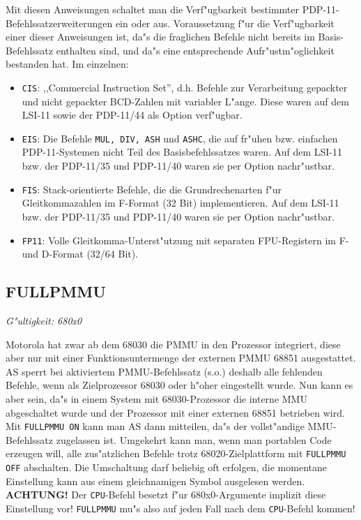 \documentclass[12pt,a4paper,twoside]{report}
\makeatletter
\newcommand{\bb}[1]{{\bf #1}}
\newcommand{\tty}[1]{{\tt #1}}
\newcommand{\ttindex}[1]{\index{#1@{\tt #1}}}
\makeatother
\begin{document}
Mit diesen Anweisungen schaltet man die Verf"ugbarkeit bestimmter
PDP-11-Befehlssatzerweiterungen ein oder aus.  Voraussetzung f"ur die
Verf"ugbarkeit einer dieser Anweisungen ist, da"s die fraglichen Befehle
nicht bereits im Basis-Befehlssatz enthalten sind, und da"s eine
entsprechende Aufr"ustm"oglichkeit bestanden hat.  Im einzelnen:
\begin{itemize}
\item{{\tt CIS}: ,,Commercial Instruction Set'', d.h. Befehle zur
      Verarbeitung gepackter und nicht gepackter BCD-Zahlen mit
      variabler L"ange.  Diese waren auf dem LSI-11 sowie der
      PDP-11/44 als Option verf"ugbar.}
\item{{\tt EIS}: Die Befehle {\tt MUL, DIV, ASH} und {\tt ASHC},
      die auf fr"uhen bzw. einfachen PDP-11-Systemen nicht Teil
      des Basisbefehlssatzes waren.  Auf dem LSI-11 bzw. der
      PDP-11/35 und PDP-11/40 waren sie per Option nachr"ustbar.}
\item{{\tt FIS}: Stack-orientierte Befehle, die die Grundrechenarten
      f"ur Gleitkommazahlen im F-Format (32 Bit) implementieren.
      Auf dem LSI-11 bzw. der PDP-11/35 und PDP-11/40 waren sie
      per Option nachr"ustbar.}
\item{{\tt FP11}: Volle Gleitkomma-Unterst"utzung mit separaten
      FPU-Registern im F- und D-Format (32/64 Bit).}
\end{itemize}


\subsection{FULLPMMU}
\ttindex{FULLPMMU}

{\em G"ultigkeit: 680x0}

Motorola hat zwar ab dem 68030 die PMMU in den Prozessor integriert,
diese aber nur mit einer Funktionsuntermenge der externen PMMU 68851
ausgestattet.  AS sperrt bei aktiviertem PMMU-Befehlssatz (s.o.) deshalb
alle fehlenden Befehle, wenn als Zielprozessor 68030 oder h"oher
eingestellt wurde.  Nun kann es aber sein, da"s in einem System mit
68030-Prozessor die interne MMU abgeschaltet wurde und der Prozessor
mit einer externen 68851 betrieben wird.  Mit \tty{FULLPMMU ON} kann man
AS dann mitteilen, da"s der vollst"andige MMU-Befehlssatz zugelassen
ist.  Umgekehrt kann man, wenn man portablen Code erzeugen will, alle
zus"atzlichen Befehle trotz 68020-Zielplattform mit \tty{FULLPMMU OFF}
abschalten.  Die Umschaltung darf beliebig oft erfolgen, die momentane
Einstellung kann aus einem gleichnamigen Symbol ausgelesen werden.
\bb{ACHTUNG!}  Der \tty{CPU}-Befehl besetzt f"ur 680x0-Argumente implizit
diese Einstellung vor!  \tty{FULLPMMU} mu"s also auf jeden Fall nach dem
\tty{CPU}-Befehl kommen!
\end{document}
